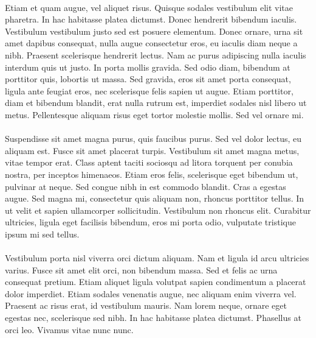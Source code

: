 \paragraph{}
Etiam et quam augue, vel aliquet risus. Quisque sodales vestibulum elit vitae pharetra. In hac habitasse platea dictumst. Donec hendrerit bibendum iaculis. Vestibulum vestibulum justo sed est posuere elementum. Donec ornare, urna sit amet dapibus consequat, nulla augue consectetur eros, eu iaculis diam neque a nibh. Praesent scelerisque hendrerit lectus. Nam ac purus adipiscing nulla iaculis interdum quis ut justo. In porta mollis gravida. Sed odio diam, bibendum at porttitor quis, lobortis ut massa. Sed gravida, eros sit amet porta consequat, ligula ante feugiat eros, nec scelerisque felis sapien ut augue. Etiam porttitor, diam et bibendum blandit, erat nulla rutrum est, imperdiet sodales nisl libero ut metus. Pellentesque aliquam risus eget tortor molestie mollis. Sed vel ornare mi.

\paragraph{}
Suspendisse sit amet magna purus, quis faucibus purus. Sed vel dolor lectus, eu aliquam est. Fusce sit amet placerat turpis. Vestibulum sit amet magna metus, vitae tempor erat. Class aptent taciti sociosqu ad litora torquent per conubia nostra, per inceptos himenaeos. Etiam eros felis, scelerisque eget bibendum ut, pulvinar at neque. Sed congue nibh in est commodo blandit. Cras a egestas augue. Sed magna mi, consectetur quis aliquam non, rhoncus porttitor tellus. In ut velit et sapien ullamcorper sollicitudin. Vestibulum non rhoncus elit. Curabitur ultricies, ligula eget facilisis bibendum, eros mi porta odio, vulputate tristique ipsum mi sed tellus.

\paragraph{}
Vestibulum porta nisl viverra orci dictum aliquam. Nam et ligula id arcu ultricies varius. Fusce sit amet elit orci, non bibendum massa. Sed et felis ac urna consequat pretium. Etiam aliquet ligula volutpat sapien condimentum a placerat dolor imperdiet. Etiam sodales venenatis augue, nec aliquam enim viverra vel. Praesent ac risus erat, id vestibulum mauris. Nam lorem neque, ornare eget egestas nec, scelerisque sed nibh. In hac habitasse platea dictumst. Phasellus at orci leo. Vivamus vitae nunc nunc.
